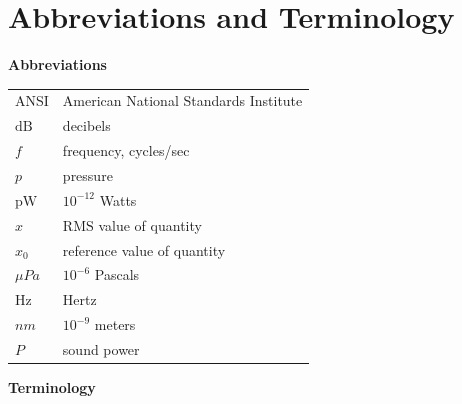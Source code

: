 \documentclass[
]{book}
\begin{document}
\hypertarget{abbreviations-and-terminology-1}{%
\section{Abbreviations and Terminology}\label{abbreviations-and-terminology-1}}

\textbf{Abbreviations}

\begin{longtable}[]{@{}ll@{}}
\toprule
\endhead
ANSI & American National Standards Institute\tabularnewline
\(\text{dB}\) & decibels\tabularnewline
\(f\) & frequency, cycles/sec\tabularnewline
\(p\) & pressure\tabularnewline
\(\text{pW}\) & \(10^{-12}\) Watts\tabularnewline
\(x\) & \(\mathrm{RMS}\) value of quantity\tabularnewline
\(x_0\) & reference value of quantity\tabularnewline
\(\mu Pa\) & \(10^{-6}\) Pascals\tabularnewline
\(\text{Hz}\) & Hertz\tabularnewline
\(nm\) & \(10^{-9}\) meters\tabularnewline
\(P\) & sound power\tabularnewline
\bottomrule
\end{longtable}

\textbf{Terminology}
\end{document}

